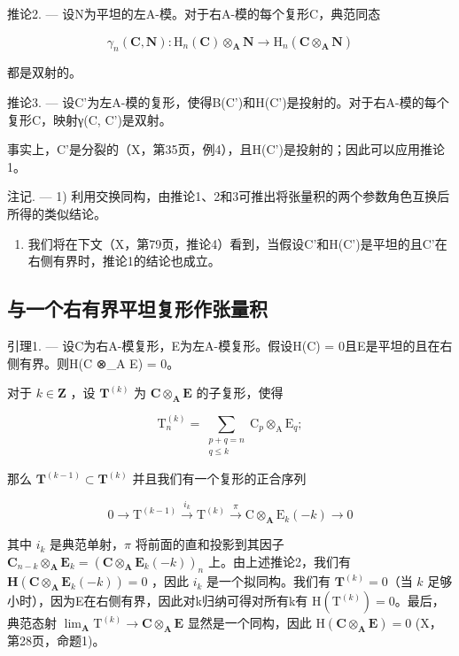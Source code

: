 推论2. --- 设N为平坦的左A-模。对于右A-模的每个复形C，典范同态

\[
\gamma_ {n} (\mathbf {C}, \mathbf {N}): \mathrm{H} _ {n} (\mathbf {C}) \otimes_ {\mathbf {A}} \mathbf {N} \rightarrow \mathrm{H} _ {n} (\mathbf {C} \otimes_ {\mathbf {A}} \mathbf {N})
\]

都是双射的。

推论3. --- 设C'为左A-模的复形，使得B(C')和H(C')是投射的。对于右A-模的每个复形C，映射γ(C, C')是双射。

事实上，C'是分裂的（X，第35页，例4），且H(C')是投射的；因此可以应用推论1。

注记. --- 1) 利用交换同构，由推论1、2和3可推出将张量积的两个参数角色互换后所得的类似结论。

\begin{enumerate}
\def\labelenumi{\arabic{enumi})}
\setcounter{enumi}{1}
\tightlist
\item
  我们将在下文（X，第79页，推论4）看到，当假设C'和H(C')是平坦的且C'在右侧有界时，推论1的结论也成立。
\end{enumerate}

\subsection{与一个右有界平坦复形作张量积}

引理1. --- 设C为右A-模复形，E为左A-模复形。假设H(C) = 0且E是平坦的且在右侧有界。则H(C ⊗\_A E) = 0。

对于 \(k \in \mathbf{Z}\) ，设 \(\mathbf{T}^{(k)}\) 为 \(\mathbf{C} \otimes_{\mathbf{A}} \mathbf{E}\) 的子复形，使得

\[
\mathrm{T}_{n}^{(k)} = \sum_{\substack{p + q = n\\ q\leqslant k}}\mathrm{C}_{p}\otimes_{\mathrm{A}}\mathrm{E}_{q};
\]

那么 \(\mathbf{T}^{(k - 1)}\subset \mathbf{T}^{(k)}\) 并且我们有一个复形的正合序列

\[
0 \longrightarrow \mathrm{T} ^ {(k - 1)} \stackrel {i _ {k}} {\longrightarrow} \mathrm{T} ^ {(k)} \stackrel {\pi} {\longrightarrow} \mathrm{C} \otimes_ {\mathbf {A}} \mathrm{E} _ {k} (- k) \longrightarrow 0
\]

其中 \(i_{k}\) 是典范单射，\(\pi\) 将前面的直和投影到其因子 \(\mathbf{C}_{n-k} \otimes_{\mathbf{A}} \mathbf{E}_{k} = (\mathbf{C} \otimes_{\mathbf{A}} \mathbf{E}_{k}(-k))_{n}\) 上。由上述推论2，我们有 \(\mathbf{H}(\mathbf{C} \otimes_{\mathbf{A}} \mathbf{E}_{k}(-k)) = 0\) ，因此 \(i_{k}\) 是一个拟同构。我们有 \(\mathbf{T}^{(k)} = 0\)（当 \(k\) 足够小时），因为E在右侧有界，因此对k归纳可得对所有k有 \(\mathrm{H}(\mathrm{T}^{(k)}) = 0\)。最后，典范态射 \(\lim_{\mathbf{A}} \mathrm{T}^{(k)} \to \mathbf{C} \otimes_{\mathbf{A}} \mathbf{E}\) 显然是一个同构，因此 \(\mathrm{H}(\mathbf{C} \otimes_{\mathbf{A}} \mathbf{E}) = 0\) (X，第28页，命题1)。

